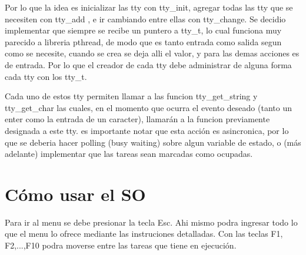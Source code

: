 \documentclass[a4paper,10pt]{article}
\begin{document}
Por lo que la idea es inicializar las tty con tty_init, agregar todas las tty que se necesiten con tty_add , e ir cambiando entre ellas con tty_change. Se decidio implementar que siempre se recibe un puntero a tty_t, lo cual funciona muy parecido a libreria pthread, de modo que es tanto entrada como salida segun como se necesite, cuando se crea se deja alli el valor, y para las demas acciones es de entrada. Por lo que el creador de cada tty debe administrar de alguna forma cada tty con los tty_t.

Cada uno de estos tty permiten llamar a las funcion tty_get_string y tty_get_char las cuales, en el momento que ocurra el evento deseado (tanto un enter como la entrada de un caracter), llamarán a la funcion previamente designada a este tty. es importante notar que esta acción es asincronica, por lo que se deberia hacer polling (busy waiting) sobre algun variable de estado, o (más adelante) implementar que las tareas sean marcadas como ocupadas.


\section*{C\'omo usar el SO}
Para ir al menu se debe presionar la tecla Esc. Ahi mismo podra ingresar todo lo que el menu lo ofrece mediante las instruciones detalladas.
Con las teclas F1, F2,...,F10 podra moverse entre las tareas que tiene en ejecución.
\end{document}
